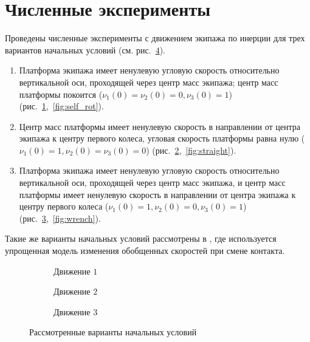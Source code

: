 
\section{Численные эксперименты}

Проведены численные эксперименты с движением экипажа по инерции для трех вариантов начальных условий (см. рис.~\ref{fig:nu_impact}).
\begin{enumerate}[wide]
    \item \label{sol:self_rot} Платформа экипажа имеет ненулевую угловую скорость относительно вертикальной оси, проходящей через центр масс экипажа; центр масс платформы покоится ($\nu_1(0) = \nu_2(0) = 0, \nu_3(0) = 1$) (рис.~\ref{fig:nu_impact_1},~\ref{fig:self_rot}).
    \item \label{sol:straight} Центр масс платформы имеет ненулевую скорость в направлении от центра экипажа к центру первого колеса, угловая скорость платформы равна нулю ($\nu_1(0) = 1, \nu_2(0) = \nu_3(0) = 0$) (рис.~\ref{fig:nu_impact_2},~\ref{fig:straight}).
    \item \label{sol:wrench} Платформа экипажа имеет ненулевую угловую скорость относительно вертикальной оси, проходящей через центр масс экипажа, и центр масс платформы имеет ненулевую скорость в направлении от центра экипажа к центру первого колеса ($\nu_1(0) = 1, \nu_2(0) = 0, \nu_3(0) = 1$) (рис.~\ref{fig:nu_impact_3},~\ref{fig:wrench}).
\end{enumerate}
Такие же варианты начальных условий рассмотрены в \cite{GerasimovZobovaPMM2018}, где используется упрощенная модель изменения обобщенных скоростей при смене контакта.

\begin{figure}
    \centering
    \begin{subfigure}[t]{0.3\textwidth}
        \centering
        \caption{Движение $1$}
        \label{fig:nu_impact_1}
    \end{subfigure}
    \quad
    \begin{subfigure}[t]{0.3\textwidth}
        \centering
        \caption{Движение $2$}
        \label{fig:nu_impact_2}
    \end{subfigure}
    \quad
    \begin{subfigure}[t]{0.3\textwidth}
        \centering
        \caption{Движение $3$}
        \label{fig:nu_impact_3}
    \end{subfigure}
    \caption{Рассмотренные варианты начальных условий}
    \label{fig:nu_impact}
\end{figure}
    
